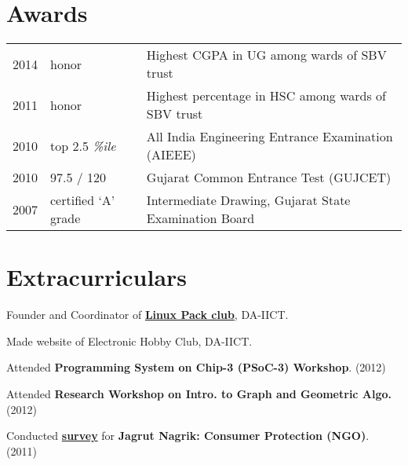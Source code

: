 \documentclass[]{deedy}
\begin{document}
\begin{minipage}[t]{0.66\textwidth}
\section{Awards}
\begin{tabular}{rll}
2014 & honor & Highest CGPA in UG among wards of SBV trust\\
2011 & honor & Highest percentage in HSC among wards of SBV trust\\
2010 & top 2.5 \textit{\%ile} & All India Engineering Entrance Examination (AIEEE)\\
2010 & 97.5 / 120 & Gujarat Common Entrance Test (GUJCET)\\
2007 & certified `A' grade & Intermediate Drawing, Gujarat State Examination Board\\
\end{tabular}

\section{Extracurriculars} 
\vspace{\topsep} %
\begin{tightemize}
\item Founder and Coordinator of  \href{http://lpdaiict.wordpress.com/}{\textbf{Linux Pack club}}, DA-IICT.
\item Made website of Electronic Hobby Club, DA-IICT.
\item Attended \textbf{Programming System on Chip-3 (PSoC-3) Workshop}. (2012)
\item Attended \textbf{Research Workshop on Intro. to Graph and Geometric Algo.} (2012)
\item Conducted \href{https://dl.dropboxusercontent.com/u/9020146/resources/reports/rural_internship.pdf}{\textbf{survey}} for \textbf{Jagrut Nagrik: Consumer Protection (NGO)}. (2011)
\end{tightemize}

\end{minipage}
\end{document}
